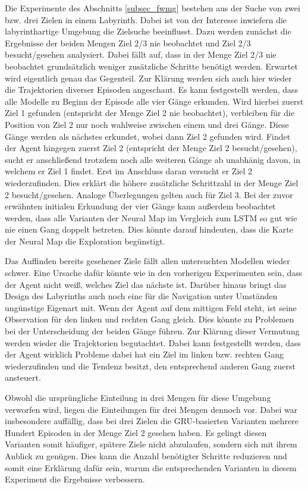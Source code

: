 Die Experimente des Abschnitts \ref{subsec_fwmg} bestehen aus der Suche von zwei bzw. drei Zielen in einem Labyrinth. Dabei ist von der Interesse inwiefern die labyrinthartige Umgebung die Zielsuche beeinflusst. Dazu werden zunächst die Ergebnisse der beiden Mengen \glqq Ziel 2/3 nie beobachtet\grqq{} und \glqq Ziel 2/3 besucht/gesehen\grqq{} analysiert. Dabei fällt auf, dass in der Menge \glqq Ziel 2/3 nie beobachtet\grqq{} grundsätzlich weniger zusätzliche Schritte benötigt werden. Erwartet wird eigentlich genau das Gegenteil. Zur Klärung werden sich auch hier wieder die Trajektorien diverser Episoden angeschaut. Es kann festgestellt werden, dass alle Modelle zu Beginn der Episode alle vier Gänge erkunden. Wird hierbei zuerst Ziel 1 gefunden (entspricht der Menge \glqq Ziel 2 nie beobachtet\grqq{}), verbleiben für die Position von Ziel 2 nur noch wahlweise zwischen einem und drei Gänge. Diese Gänge werden als nächstes erkundet, wobei dann Ziel 2 gefunden wird. Findet der Agent hingegen zuerst Ziel 2 (entspricht der Menge \glqq Ziel 2 besucht/gesehen\grqq{}), sucht er anschließend trotzdem noch alle weiteren Gänge ab unabhänig davon, in welchem er Ziel 1 findet. Erst im Anschluss daran versucht er Ziel 2 wiederzufinden. Dies erklärt die höhere zusätzliche Schrittzahl in der Menge \glqq Ziel 2 besucht/gesehen\grqq{}. Analoge Überlegungen gelten auch für Ziel 3. Bei der zuvor erwähnten initialen Erkundung der vier Gänge kann außerdem beobachtet werden, dass alle Varianten der Neural Map im Vergleich zum LSTM so gut wie nie einen Gang doppelt betreten. Dies könnte darauf hindeuten, dass die Karte der Neural Map die Exploration begünstigt.

Das Auffinden bereits gesehener Ziele fällt allen untersuchten Modellen wieder schwer. Eine Ursache dafür könnte wie in den vorherigen Experimenten sein, dass der Agent nicht weiß, welches Ziel das nächste ist. Darüber hinaus bringt das Design des Labyrinths auch noch eine für die Navigation unter Umständen ungünstige Eigenart mit. Wenn der Agent auf dem mittigen Feld steht, ist seine Observation für den linken und rechten Gang gleich. Dies könnte zu Problemen bei der Unterscheidung der beiden Gänge führen. Zur Klärung dieser Vermutung werden wieder die Trajektorien begutachtet. Dabei kann festgestellt werden, dass der Agent wirklich Probleme dabei hat ein Ziel im linken bzw. rechten Gang wiederzufinden und die Tendenz besitzt, den entsprechend anderen Gang zuerst ansteuert.

Obwohl die ursprüngliche Einteilung in drei Mengen für diese Umgebung verworfen wird, liegen die Einteilungen für drei Mengen dennoch vor. Dabei war insbesondere auffällig, dass bei drei Zielen die GRU-basierten Varianten mehrere Hundert Episoden in der Menge \glqq Ziel 2 gesehen\grqq{} haben. Es gelingt diesen Varianten somit häufiger, spätere Ziele nicht abzulaufen, sondern sich mit ihrem Anblick zu genügen. Dies kann die Anzahl benötigter Schritte reduzieren und somit eine Erklärung dafür sein, warum die entsprechenden Varianten in diesem Experiment die Ergebnisse verbessern.

